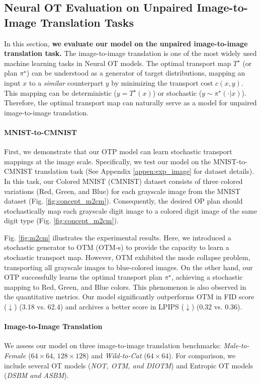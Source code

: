 \subsection{Neural OT Evaluation on Unpaired Image-to-Image Translation Tasks} \label{sec:exp_image}
In this section, \textbf{we evaluate our model on the unpaired image-to-image translation task.} The image-to-image translation is one of the most widely used machine learning tasks in Neural OT models. The optimal transport map $T^{\star}$ (or plan $\pi^{\star}$) can be understood as a generator of target distributions, mapping an input $x$ to a \textit{similar} counterpart $y$ by minimizing the transport cost $c(x, y)$. This mapping can be deterministic ($y = T^{\star}(x)$) or stochastic ($y \sim \pi^{\star}(\cdot | x)$). 
Therefore, the optimal transport map can naturally serve as a model for unpaired image-to-image translation.

\vspace{-5pt}
\paragraph{MNIST-to-CMNIST}
First, we demonstrate that our OTP model can learn stochastic transport mappings at the image scale. Specifically, we test our model on the MNIST-to-CMNIST translation task (See Appendix \ref{appen:exp_image} for dataset details).
In this task, our Colored MNIST (CMNIST) dataset consists of three colored variations (Red, Green, and Blue) for each grayscale image from the MNIST dataset (Fig. \ref{fig:concept_m2cm}). Consequently, the desired OP plan should stochastically map each grayscale digit image to a colored digit image of the same digit type (Fig. \ref{fig:concept_m2cm}). 

Fig. \ref{fig:m2cm} illustrates the experimental results. Here, we introduced a stochastic generator to OTM (OTM-s) to provide the capacity to learn a stochastic transport map. However, OTM exhibited the mode collapse problem, transporting all grayscale images to blue-colored images. On the other hand, our OTP successfully learns the optimal transport plan $\pi^{\star}$, achieving a stochastic mapping to Red, Green, and Blue colors. This phenomenon is also observed in the quantitative metrics. Our model significantly outperforms OTM in FID score ($\downarrow$) (3.18 vs. 62.4) and archives a better score in LPIPS ($\downarrow$) (0.32 vs. 0.36).

\vspace{-5pt}
\paragraph{Image-to-Image Translation}
We assess our model on three image-to-image translation benchmarks:  \textit{Male-to-Female \citep{celeba}} ($64\times64$, $128\times128$) and \textit{Wild-to-Cat \citep{afhq}} ($64 \times 64$). For comparison, we include several OT models (\textit{NOT, OTM, and DIOTM}) and Entropic OT models (\textit{DSBM and ASBM}).

